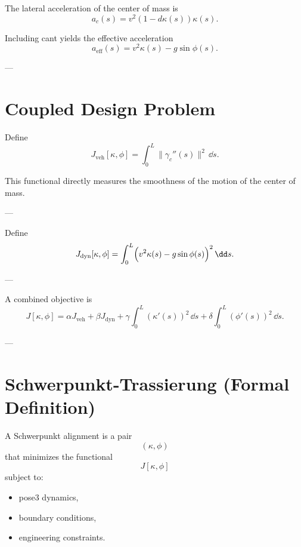 \begin{definition}
The lateral acceleration of the center of mass is
\[
a_c(s)
=
v^2 (1 - d\kappa(s))\kappa(s).
\]
\end{definition}

\begin{remark}
Including cant yields the effective acceleration
\[
a_{\mathrm{eff}}(s)
=
v^2 \kappa(s) - g\sin\phi(s).
\]
\end{remark}

---

\section{Coupled Design Problem}

\begin{definition}
Define
\[
J_{\mathrm{veh}}[\kappa,\phi]
=
\int_0^L
\|\gamma_c''(s)\|^2
\,\dd s.
\]
\end{definition}

\begin{remark}
This functional directly measures the smoothness of the motion of the
center of mass.
\end{remark}

---

\begin{definition}
Define
\[
J_{\mathrm{dyn}}[\kappa,\phi]
=
\int_0^L
\Bigl(
v^2 \kappa(s) - g\sin\phi(s)
\Bigr)^2
\,\dd s.
\]
\end{definition}

---

\begin{definition}
A combined objective is
\[
J[\kappa,\phi]
=
\alpha J_{\mathrm{veh}}
+
\beta J_{\mathrm{dyn}}
+
\gamma \int_0^L (\kappa'(s))^2 \,\dd s
+
\delta \int_0^L (\phi'(s))^2 \,\dd s.
\]
\end{definition}

---

\section{Schwerpunkt-Trassierung (Formal Definition)}

\begin{definition}
A Schwerpunkt alignment is a pair
\[
(\kappa,\phi)
\]
that minimizes the functional
\[
J[\kappa,\phi]
\]
subject to:
\begin{itemize}
\item pose3 dynamics,
\item boundary conditions,
\item engineering constraints.
\end{itemize}
\end{definition}


